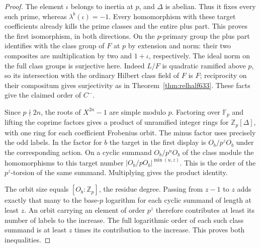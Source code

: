 \documentclass[a4paper,11pt]{article}
\theoremstyle{definition}
\theoremstyle{remark}
\newcommand{\ZZ}{\mathbb Z}\newcommand{\ord}{\operatorname{ord}}
\numberwithin{equation}{section}
\begin{document}
\begin{proof}
The element \(\iota\) belongs to inertia at \(p\), and
\(\Delta\) is abelian. Thus it fixes every such prime, whereas
\(\lambda^b(\iota)=-1\). Every homomorphism with these target
coefficients already kills the prime classes and the entire
plus part. This proves the first isomorphism, in both directions.
On the \(p\)-primary group the plus part identifies with the
class group of \(F\) at \(p\) by extension and norm: their two
composites are multiplication by two and \(1+\iota\),
respectively. The ideal norm on the full class groups is
surjective here. Indeed \(L/F\) is quadratic ramified above
\(p\), so its intersection with the ordinary Hilbert class
field of \(F\) is \(F\); reciprocity on their compositum gives
surjectivity as in Theorem~\ref{thm:relhalf633}. These facts
give the claimed order of \(C^-\).

Since \(p\nmid2n\), the roots of \(X^{2n}-1\) are simple
modulo \(p\). Factoring over \(\mathbb F_p\) and lifting the
coprime factors gives a product of unramified integer rings
for \(\ZZ_p[\Delta]\), with one ring for each coefficient
Frobenius orbit. The minus factor uses precisely the odd
labels. In the factor for \(b\) the target in the first
display is \(O_b/p^zO_b\) under the corresponding action.
On a cyclic summand \(O_b/p^uO_b\) of the class module the
homomorphisms to this target number
\(|O_b/pO_b|^{\min(u,z)}\). This is the order of the
\(p^z\)-torsion of the same summand. Multiplying gives the
product identity.

The orbit size equals \([O_b:\ZZ_p]\), the residue degree.
Passing from \(z-1\) to \(z\) adds exactly that many to the
base-\(p\) logarithm for each cyclic summand of length at
least \(z\). An orbit carrying an element of order \(p^z\)
therefore contributes at least its number of labels to the
increase. The full logarithmic order of each such class
summand is at least \(z\) times its contribution to the
increase. This proves both inequalities.
\end{proof}
\end{document}
